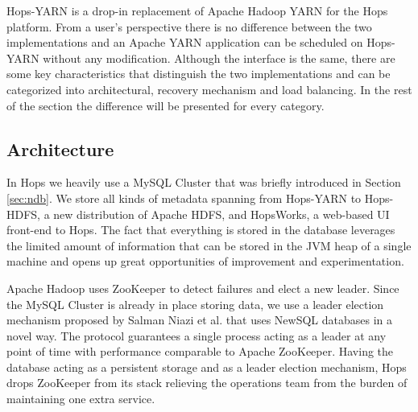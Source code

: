 Hops-YARN is a drop-in replacement of Apache Hadoop YARN for the Hops
\cite{hops} platform. From a user's perspective there is no difference
between the two implementations and an Apache YARN application can be
scheduled on Hops-YARN without any modification. Although the
interface is the same, there are some key characteristics that
distinguish the two implementations and can be categorized into
architectural, recovery mechanism and load balancing. In the rest of
the section the difference will be presented for every category.

\subsection{Architecture}
\label{ssec:hopsyarn_arch}
In Hops we heavily use a MySQL Cluster that was briefly introduced in
Section \ref{sec:ndb}. We store all kinds of metadata spanning from
Hops-YARN to Hops-HDFS, a new distribution of Apache HDFS, and
HopsWorks, a web-based UI front-end to Hops. The fact that everything
is stored in the database leverages the limited amount of information
that can be stored in the JVM heap of a single machine and opens up
great opportunities of improvement and experimentation.

Apache Hadoop uses ZooKeeper to detect failures and elect a new leader.
Since the MySQL Cluster is already in place storing data, we use a
leader election mechanism proposed by Salman Niazi et
al. \cite{Niazi2015} that uses NewSQL databases in a novel way.
The protocol guarantees a single process acting
as a leader at any point of time with performance comparable to
Apache ZooKeeper. Having the database acting as a persistent storage
and as a leader election mechanism, Hops drops ZooKeeper from its
stack relieving the operations team from the burden of maintaining
one extra service.

